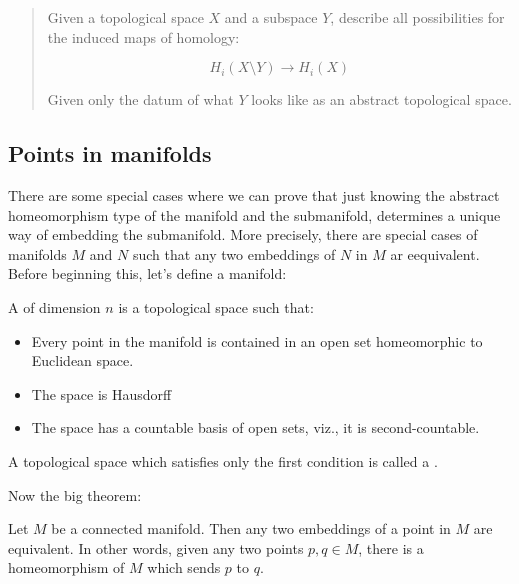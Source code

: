 \documentclass[a4paper]{amsart}
\begin{document}
\begin{quote}
  Given a topological space $X$ and a subspace $Y$, describe all
  possibilities for the induced maps of homology:

  $$H_i(X \setminus Y) \to H_i(X)$$

  Given only the datum of what $Y$ looks like as an abstract
  topological space.
\end{quote}

\subsection{Points in manifolds}

There are some special cases where we can prove that just knowing the
abstract homeomorphism type of the manifold and the submanifold,
determines a unique way of embedding the submanifold. More precisely,
there are special cases of manifolds $M$ and $N$ such that any two
embeddings of $N$ in $M$ ar eequivalent. Before beginning this, let's
define a manifold:

\begin{definer}[Manifold]
  A  of dimension $n$ is a topological space such that:

  \begin{itemize}
  \item Every point in the manifold is contained in an open set
    homeomorphic to Euclidean space.
  \item The space is Hausdorff
  \item The space has a countable basis of open sets, viz., it is
    second-countable.
  \end{itemize}

  A topological space which satisfies only the first condition is
  called a .
\end{definer}

Now the big theorem:

\begin{theorem}
  Let $M$ be a connected manifold. Then any two embeddings of a point
  in $M$ are equivalent. In other words, given any two points $p,q \in
  M$, there is a homeomorphism of $M$ which sends $p$ to $q$.
\end{theorem}
\end{document}
